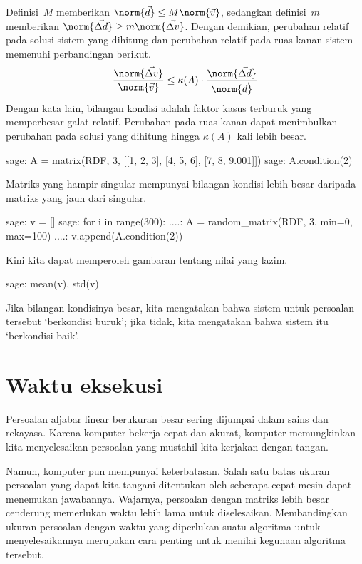 Definisi~$M$ memberikan $\norm{\vec{d}}\leq M\norm{\vec{v}}$, sedangkan
definisi~$m$ memberikan $\norm{\vec{\Delta d}}\geq m\norm{\vec{\Delta v}}$.
Dengan demikian, perubahan relatif pada solusi sistem yang dihitung
dan perubahan relatif pada ruas kanan sistem memenuhi perbandingan berikut.
\begin{equation*}
  \frac{\norm{\vec{\Delta v}}}{\norm{\vec{v}}}
   \leq \kappa(A)\cdot \frac{\norm{\vec{\Delta d}}}{\norm{\vec{d}}}
\end{equation*}
Dengan kata lain, bilangan kondisi adalah faktor kasus terburuk yang
memperbesar galat relatif.
Perubahan pada ruas kanan dapat menimbulkan perubahan pada solusi yang dihitung
hingga $\kappa(A)$ kali lebih besar.
\begin{sagecommandline}
sage: A = matrix(RDF, 3, [[1, 2, 3], [4, 5, 6], [7, 8, 9.001]])
sage: A.condition(2)
\end{sagecommandline}
Matriks yang hampir singular mempunyai bilangan kondisi lebih besar daripada
matriks yang jauh dari singular.
\begin{sagecommandline}
sage: v = []                                                                    
sage: for i in range(300): 
....:     A = random_matrix(RDF, 3, min=0, max=100) 
....:     v.append(A.condition(2))                                                                           
\end{sagecommandline}
Kini kita dapat memperoleh gambaran tentang nilai yang lazim.
\begin{sagecommandline}
sage: mean(v), std(v)
\end{sagecommandline}
Jika bilangan kondisinya besar, kita mengatakan bahwa
sistem untuk persoalan tersebut `berkondisi buruk';
jika tidak, kita mengatakan bahwa sistem itu `berkondisi baik'.





\section{Waktu eksekusi}
Persoalan aljabar linear berukuran besar sering dijumpai dalam sains dan
rekayasa.
Karena komputer bekerja cepat dan akurat,
komputer memungkinkan kita menyelesaikan persoalan
yang mustahil kita kerjakan dengan tangan.

Namun, komputer pun mempunyai keterbatasan.
Salah satu batas ukuran persoalan yang dapat kita tangani ditentukan oleh
seberapa cepat mesin dapat menemukan jawabannya.
Wajarnya, persoalan dengan matriks lebih besar cenderung memerlukan waktu
lebih lama untuk diselesaikan.
Membandingkan ukuran persoalan dengan waktu yang diperlukan suatu algoritma
untuk menyelesaikannya merupakan cara penting untuk menilai kegunaan
algoritma tersebut.

